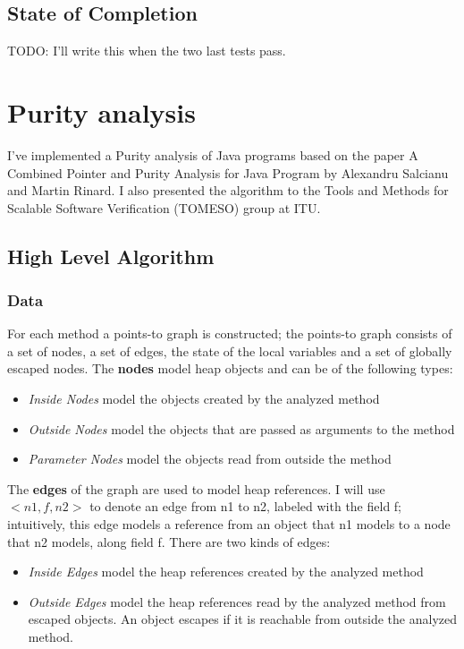 \documentclass[11pt]{exam}
\begin{document}
\subsection{State of Completion}

TODO: I'll write this when the two last tests pass.

\newpage

\section{Purity analysis}

I've implemented a Purity analysis of Java programs based on the paper
A Combined Pointer and Purity Analysis for Java Program by Alexandru
Salcianu and Martin Rinard. I also presented the algorithm to the
Tools and Methods for Scalable Software Verification (TOMESO) group at
ITU.

\subsection{High Level Algorithm}

\subsubsection*{Data}

For each method a points-to graph is constructed; the points-to graph
consists of a set of nodes, a set of edges, the state of the local
variables and a set of globally escaped nodes. The \textbf{nodes}
model heap objects and can be of the following types:

\begin{itemize}
  \setlength{\itemsep}{1pt}
  \setlength{\parskip}{0pt}
  \item \emph{Inside Nodes} model the objects created by the analyzed method
  \item \emph{Outside Nodes} model the objects that are passed as arguments 
        to the method
  \item \emph{Parameter Nodes} model the objects read from outside the method
\end{itemize}

The \textbf{edges} of the graph are used to model heap references. I will use
$<n1,f,n2>$ to denote an edge from n1 to n2, labeled with the field f;
intuitively, this edge models a reference from an object that n1
models to a node that n2 models, along field f. There are two kinds of
edges:

\begin{itemize}
  \setlength{\itemsep}{1pt}
  \setlength{\parskip}{0pt}
  \item \emph{Inside Edges} model the heap references created by the analyzed 
        method
  \item \emph{Outside Edges} model the heap references read by the analyzed 
        method from escaped objects. An object escapes if it is reachable 
        from outside the analyzed method.
\end{itemize}
\end{document}
